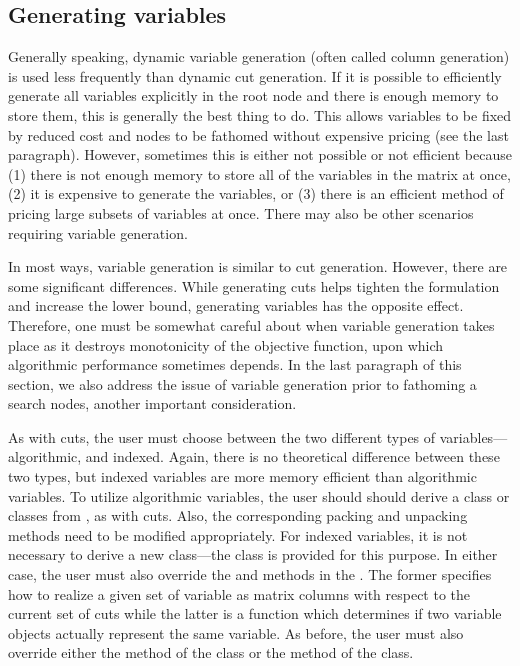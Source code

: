 \subsection{Generating variables}

Generally speaking, dynamic variable generation (often called column
generation) is used less frequently than dynamic cut generation. If it
is possible to efficiently generate all variables explicitly in the
root node and there is enough memory to store them, this is generally
the best thing to do. This allows variables to be fixed by reduced
cost and nodes to be fathomed without expensive pricing (see the last
paragraph). However, sometimes this is either not possible or not
efficient because (1) there is not enough memory to store all of the
variables in the matrix at once, (2) it is expensive to generate the
variables, or (3) there is an efficient method of pricing large
subsets of variables at once. There may also be other scenarios
requiring variable generation.

In most ways, variable generation is similar to cut generation.
However, there are some significant differences. While generating cuts
helps tighten the formulation and increase the lower bound, generating
variables has the opposite effect. Therefore, one must be somewhat
careful about when variable generation takes place as it destroys
monotonicity of the objective function, upon which algorithmic
performance sometimes depends. In the last paragraph of this section,
we also address the issue of variable generation prior to fathoming a
search nodes, another important consideration.

As with cuts, the user must choose between the two different types of
variables---algorithmic, and indexed. Again, there is no theoretical
difference between these two types, but indexed variables are more
memory efficient than algorithmic variables. To utilize algorithmic
variables, the user should should derive a class or classes from 
, as with cuts. Also, the corresponding packing and
unpacking methods need to be modified appropriately. For indexed
variables, it is not necessary to derive a new class---the 
 class is provided for this purpose. In either case,
the user must also override the  and 
 methods in the . The former
specifies how to realize a given set of variable as matrix columns
with respect to the current set of cuts while the latter is a function
which determines if two variable objects actually represent the same variable.
As before, the user must also override either the 
 method of the  class or the 
 method of the  class.

